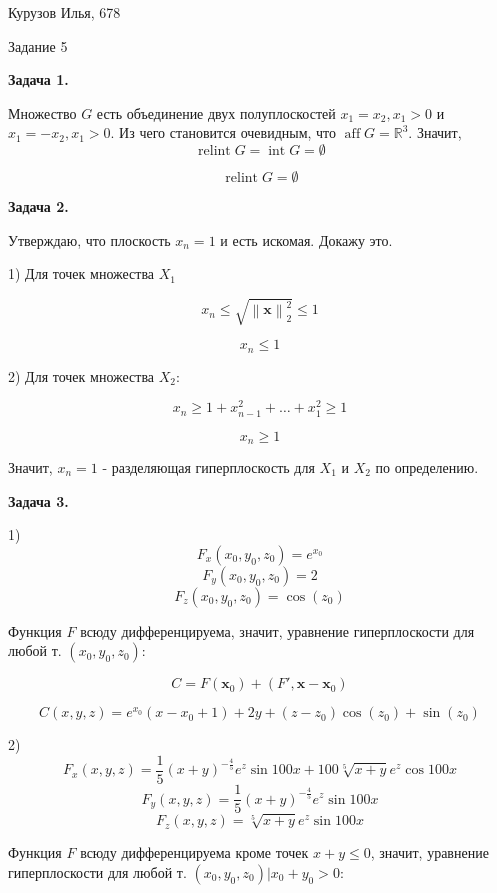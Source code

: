 \documentclass[12pt]{article}
\DeclareMathOperator*{\aff}{aff}
\DeclareMathOperator*{\relint}{relint}
\DeclareMathOperator*{\intset}{int}
\newcommand\norm[1]{\left\lVert#1\right\rVert}
\begin{document}
\begin{center}
	{Курузов Илья, 678}

	{Задание 5}
\end{center}

\begin{center}
	\textbf{Задача 1.}
\end{center}

Множество $G$ есть объединение двух полуплоскостей $x_1 = x_2, x_1>0$ и $x_1 = -x_2, x_1>0$. Из чего становится очевидным, что $\aff G = \mathbb{R}^3$. Значит, 
$$\relint G = \intset G = \emptyset$$

$$\boxed{\relint G = \emptyset}$$

\begin{center}
	\textbf{Задача 2.}
\end{center}

Утверждаю, что плоскость $x_n = 1$ и есть искомая. Докажу это.

1) Для точек множества $X_1$

$$x_n \leq \sqrt{\norm{\textbf{x}}_2^2} \leq 1$$

$$x_n \leq 1$$

2) Для точек множества $X_2$:

$$x_n \geq 1 + x_{n-1}^2 + \dots + x_1^2 \geq 1$$

$$x_n \geq 1$$

Значит, $x_n = 1$ - разделяющая гиперплоскость для $X_1$ и $X_2$  по определению.

\begin{center}
	\textbf{Задача 3.}
\end{center}

1) 
$$F_x(x_0, y_0, z_0) = e^{x_0}$$
$$F_y(x_0, y_0, z_0) = 2$$
$$F_z(x_0, y_0, z_0) = \cos(z_0)$$

Функция $F$ всюду дифференцируема, значит, уравнение гиперплоскости для любой т. $(x_0, y_0, z_0)$:

$$C = F(\textbf{x}_0) + (F', \textbf{x} - \textbf{x}_0) $$

$$C(x, y, z) = e^{x_0}(x - x_0 + 1) + 2y + (z-z_0)\cos(z_0) + \sin(z_0)$$

2) 
$$F_x(x, y, z) = \frac{1}{5}(x+y)^{-\frac{4}{5}}e^z \sin 100x + 100\sqrt[5]{x+y}e^z \cos 100x$$
$$F_y(x, y, z) = \frac{1}{5}(x+y)^{-\frac{4}{5}}e^z \sin 100x$$
$$F_z(x, y, z) = \sqrt[5]{x+y}e^z \sin 100x$$

Функция $F$ всюду дифференцируема кроме точек $x + y \leq 0$, значит, уравнение гиперплоскости для любой т. $(x_0, y_0, z_0)|x_0 + y_0 > 0$:
\end{document}
